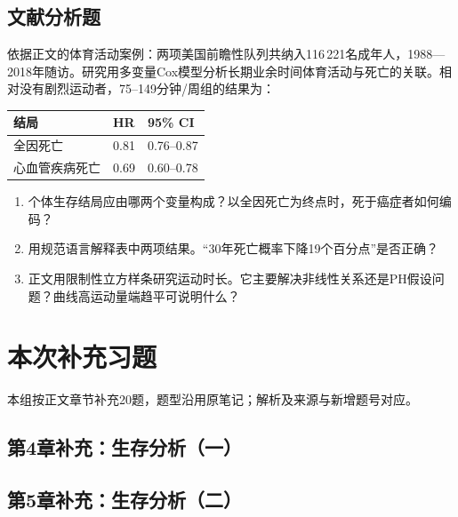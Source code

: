 \par\addvspace{8pt}\noindent\begin{minipage}{\linewidth}

\subsection{文献分析题}


依据正文的体育活动案例：两项美国前瞻性队列共纳入116\,221名成年人，1988—2018年随访。研究用多变量Cox模型分析长期业余时间体育活动与死亡的关联。相对没有剧烈运动者，75--149分钟/周组的结果为：
\begin{center}\begin{tabular}{lll}\toprule
结局 & HR & 95\% CI\\\midrule
全因死亡 & 0.81 & 0.76--0.87\\
心血管疾病死亡 & 0.69 & 0.60--0.78\\\bottomrule
\end{tabular}\end{center}
\begin{enumerate}
\item 个体生存结局应由哪两个变量构成？以全因死亡为终点时，死于癌症者如何编码？
\item 用规范语言解释表中两项结果。“30年死亡概率下降19个百分点”是否正确？
\item 正文用限制性立方样条研究运动时长。它主要解决非线性关系还是PH假设问题？曲线高运动量端趋平可说明什么？
\end{enumerate}


\end{minipage}\par\vspace{5pt}


\clearpage\section{本次补充习题}
本组按正文章节补充20题，题型沿用原笔记；解析及来源与新增题号对应。
\subsection*{第4章补充：生存分析（一）}

\subsection*{第5章补充：生存分析（二）}


